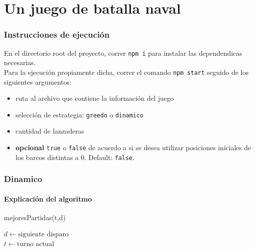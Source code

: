 \documentclass{article}
\begin{document}
\part{Un juego de batalla naval}
\section{Instrucciones de ejecución}
En el directorio root del proyecto, correr \texttt{npm i} para instalar las 
dependendicas necesarias.\\
Para la ejecución propiamente dicha, correr el comando \texttt{npm start}
seguido de los siguientes argumentos:
\begin{itemize}
        \item ruta al archivo que contiene la información del juego
        \item selección de estrategia: \texttt{greedo} o 
            \texttt{dinamico} 
        \item cantidad de lanzaderas 
        \item \textbf{opcional} \texttt{true} o \texttt{false} de acuerdo a si se 
            desea utilizar posiciones iniciales de los barcos distintas a 0.
            Default: \texttt{false}.
\end{itemize}
\section{Dinamico}
\subsection{Explicación del algoritmo}

\begin{algorithm}
\caption{mejoresPartidas(t,d)}
    $d \leftarrow \text{siguiente disparo}$ \\
    $t \leftarrow \text{turno actual}$ \\
\end{algorithm}
\end{document}
